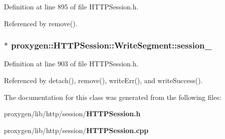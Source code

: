Definition at line 895 of file H\+T\+T\+P\+Session.\+h.



Referenced by remove().

\subsubsection[{session\+\_\+}]{$\ast$ proxygen\+::\+H\+T\+T\+P\+Session\+::\+Write\+Segment\+::session\+\_\+\hspace{0.3cm}{\ttfamily [private]}}\label{classproxygen_1_1HTTPSession_1_1WriteSegment_a5d9b8dc3d58c3d793c8666fb03d89c97}


Definition at line 903 of file H\+T\+T\+P\+Session.\+h.



Referenced by detach(), remove(), write\+Err(), and write\+Success().



The documentation for this class was generated from the following files\+:\begin{DoxyCompactItemize}
\item 
proxygen/lib/http/session/{\bf H\+T\+T\+P\+Session.\+h}\item 
proxygen/lib/http/session/{\bf H\+T\+T\+P\+Session.\+cpp}\end{DoxyCompactItemize}
